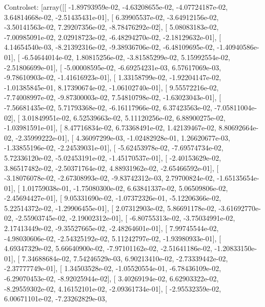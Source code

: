 \documentclass{article}
\begin{document}
Controlset: [array([[ -1.89793959e-02,  -4.63208655e-02,  -4.07724187e-02,
          3.64814668e-02,  -2.51435431e-01],
       [  6.39905537e-02,  -3.64912156e-02,  -3.50141563e-02,
          7.29207356e-02,  -8.78476292e-02],
       [  5.08083183e-02,  -7.00985091e-02,   2.02918723e-02,
         -6.48294270e-02,  -2.18129632e-01],
       [  4.14654540e-03,  -8.21392316e-02,  -9.38936706e-02,
         -6.48109695e-02,  -1.40940586e-01],
       [ -6.54644014e-02,   1.80815256e-02,  -3.81585299e-02,
          5.15992554e-02,  -2.51806699e-01],
       [ -5.00008595e-02,  -6.69254231e-03,   6.57617069e-03,
         -9.78610903e-02,  -1.41616923e-01],
       [  1.33158799e-02,  -1.92204147e-02,  -1.01385845e-01,
          8.17390674e-02,  -1.06102740e-01],
       [  9.55572216e-02,  -7.74008997e-02,  -9.87300003e-02,
          7.54810798e-02,  -1.63023043e-01],
       [ -7.56681435e-02,   5.71793368e-02,  -6.16117966e-02,
          6.37423563e-02,  -7.05811004e-02],
       [  3.01849951e-02,   6.52539663e-02,   5.11120256e-02,
          6.88900275e-02,  -1.03981591e-01],
       [  8.47716834e-02,   6.73368491e-02,   1.42139467e-02,
          8.80692664e-02,  -2.35999222e-01],
       [  4.36097299e-03,  -1.02482928e-01,   1.26620677e-03,
         -1.33855196e-02,  -2.24539031e-01],
       [ -5.62453978e-02,  -7.69574734e-02,   5.72336120e-02,
         -5.02453191e-02,  -1.45170537e-01],
       [ -2.40153629e-02,   3.86517482e-02,  -2.50371764e-02,
          4.88931962e-02,  -2.65466592e-01],
       [ -3.18076078e-02,  -2.67308993e-02,  -9.83742312e-03,
          2.79700824e-02,  -1.65135654e-01],
       [  1.01759038e-01,  -1.75080300e-02,   6.63841337e-02,
          5.06509806e-02,  -2.45694427e-01],
       [  9.05331690e-02,  -1.07372326e-01,  -5.12206366e-02,
          5.22514372e-02,  -1.29906455e-01],
       [  2.07312903e-02,   5.86691178e-02,  -3.61692770e-02,
         -2.55903745e-02,  -2.19002312e-01],
       [ -6.80755313e-02,  -3.75034991e-02,   2.17413449e-02,
         -9.35527665e-02,  -2.48264601e-01],
       [  7.99745544e-02,  -4.98030606e-02,  -2.54325192e-02,
          5.11242797e-02,  -1.93980933e-01],
       [  4.69347329e-02,   5.66640900e-02,  -7.97101162e-02,
         -2.51641186e-02,  -1.20833150e-01],
       [  7.34688684e-02,   7.54246529e-03,   6.90213410e-02,
         -2.73339442e-02,  -2.37777749e-01],
       [  1.34503528e-02,  -1.05520554e-01,  -6.78436109e-02,
         -6.29070453e-02,  -8.92025944e-02],
       [  3.40269194e-02,   6.62903322e-02,  -8.29559302e-02,
          4.16152101e-02,  -2.09361734e-01],
       [ -2.95532359e-02,   6.00671101e-02,  -7.23262829e-03,
\end{document}
